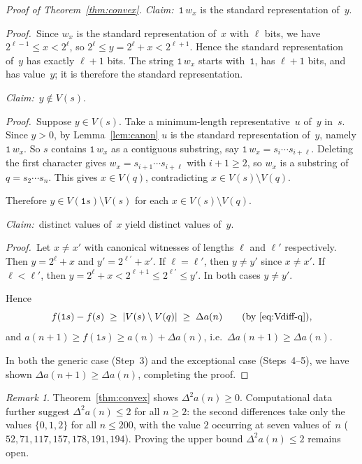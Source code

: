 ﻿\documentclass[11pt,a4paper]{article}
\theoremstyle{plain}
\theoremstyle{definition}
\theoremstyle{remark}
\newtheorem{remark}[theorem]{Remark}
\begin{document}
\begin{proof}[Proof of Theorem~\ref{thm:convex}]
\textit{Claim:}\ $\mathtt{1}\,w_x$ is the standard representation
of~$y$.

\textit{Proof.}\ Since $w_x$ is the standard representation of~$x$
with $\ell$ bits, we have $2^{\ell-1}\le x<2^{\ell}$, so
$2^{\ell}\le y=2^{\ell}+x<2^{\ell+1}$.  Hence the standard
representation of~$y$ has exactly $\ell+1$ bits.  The string
$\mathtt{1}\,w_x$ starts with~$\mathtt{1}$, has $\ell+1$ bits, and
has value~$y$; it is therefore the standard representation.

\textit{Claim:}\ $y\notin V(s)$.

\textit{Proof.}\ Suppose $y\in V(s)$.  Take a minimum-length
representative~$u$ of~$y$ in~$s$.  Since $y>0$, by
Lemma~\ref{lem:canon} $u$ is the standard representation of~$y$,
namely $\mathtt{1}\,w_x$.  So $s$ contains $\mathtt{1}\,w_x$ as a
contiguous substring, say $\mathtt{1}\,w_x=s_i\cdots s_{i+\ell}$.
Deleting the first character gives $w_x=s_{i+1}\cdots s_{i+\ell}$
with $i+1\ge2$, so $w_x$ is a substring of $q=s_2\cdots s_n$.  This
gives $x\in V(q)$, contradicting $x\in V(s)\setminus V(q)$.

Therefore $y\in V(\mathtt{1}s)\setminus V(s)$ for each
$x\in V(s)\setminus V(q)$.

\textit{Claim:}\ distinct values of~$x$ yield distinct values of~$y$.

\textit{Proof.}\ Let $x\ne x'$ with canonical witnesses of lengths
$\ell$ and $\ell'$ respectively. Then $y=2^{\ell}+x$ and
$y'=2^{\ell'}+x'$.  If $\ell=\ell'$, then $y\ne y'$ since $x\ne x'$.
If $\ell<\ell'$, then $y=2^{\ell}+x<2^{\ell+1}\le2^{\ell'}\le y'$.
In both cases $y\ne y'$.

\smallskip
Hence
\[
  f(\mathtt{1}s)-f(s)
  \;\ge\;
  |V(s)\setminus V(q)|
  \;\ge\;
  \Delta a(n)
  \qquad\text{(by~\eqref{eq:Vdiff-q})},
\]
and $a(n+1)\ge f(\mathtt{1}s)\ge a(n)+\Delta a(n)$, i.e.\
$\Delta a(n+1)\ge\Delta a(n)$.

\medskip
In both the generic case (Step~3) and the exceptional case (Steps~4--5),
we have shown $\Delta a(n+1)\ge\Delta a(n)$, completing the proof.
\end{proof}

\begin{remark}\label{rem:convex-upper}
Theorem~\ref{thm:convex} shows $\Delta^2 a(n)\ge0$.  Computational
data~\cite{github} further suggest $\Delta^2 a(n)\le2$ for all
$n\ge2$: the second differences take only the values $\{0,1,2\}$ for
all $n\le200$, with the value $2$ occurring at seven values of~$n$
($52, 71, 117, 157, 178, 191, 194$).  Proving the upper bound
$\Delta^2 a(n)\le2$ remains open.
\end{remark}
\end{document}
